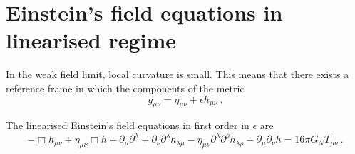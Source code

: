 \section{Einstein's field equations in linearised regime}

    In the weak field limit, local curvature is small. This means that there exists a reference frame in which the components of the metric 
    \begin{equation*}
        g_{\mu\nu} = \eta_{\mu\nu} + \epsilon h_{\mu\nu} ~.
    \end{equation*}

    The linearised Einstein's field equations in first order in $\epsilon$ are 
    \begin{equation*}
        - \Box h_{\mu\nu} + \eta_{\mu\nu} \Box h + \partial_\mu \partial^\lambda + \partial_\nu \partial^\lambda h_{\lambda \mu} - \eta_{\mu\nu} \partial^\lambda \partial^\rho h_{\lambda \rho} - \partial_\mu \partial_\nu h = 16 \pi G_N T_{\mu\nu} ~.
    \end{equation*}
